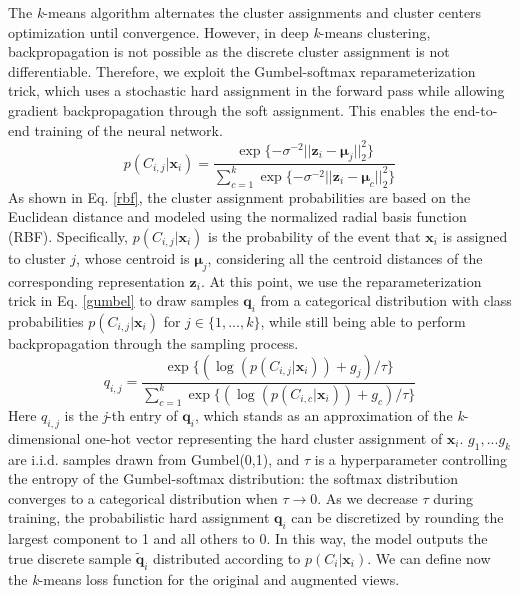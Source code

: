 \documentclass[times, review, 10pt]{elsarticle}
\begin{document}
The \textit{k}-means algorithm alternates the cluster assignments and cluster centers optimization until convergence. However, in deep \textit{k}-means clustering, backpropagation is not possible as the discrete cluster assignment is not differentiable. Therefore, we exploit the Gumbel-softmax reparameterization trick, which uses a stochastic hard assignment in the forward pass while allowing gradient backpropagation through the soft assignment. This enables the end-to-end training of the neural network.
%
\begin{equation}
    p(C_{i,j} | \mathbf{x}_i) = \frac{\exp{\{ -\sigma^{-2} \lvert\lvert \mathbf{z}_i - \bm{\mu}_j \rvert\rvert_2^2 \}}}{\sum_{c=1}^k \exp \{ -\sigma^{-2} \lvert\lvert \mathbf{z}_i - \bm{\mu}_c \rvert\rvert_2^2 \}}
    \label{rbf}
\end{equation}
%
As shown in Eq. \ref{rbf}, the cluster assignment probabilities are based on the Euclidean distance and modeled using the normalized radial basis function (RBF). Specifically, $p(C_{i,j} | \mathbf{x}_i)$ is the probability of the event that $\mathbf{x}_i$ is assigned to cluster $j$, whose centroid is $\bm{\mu}_j$, considering all the centroid distances of the corresponding representation $\mathbf{z}_i$. At this point, we use the reparameterization trick in Eq. \ref{gumbel} to draw samples $\mathbf{q}_i$ from a categorical distribution with class probabilities $p(C_{i,j} | \mathbf{x}_i)$ for $j \in \{1, ..., k\}$, while still being able to perform backpropagation through the sampling process.
%
\begin{equation}
    q_{i,j} = \frac{\exp{\{ (\log({p(C_{i,j} | \mathbf{x}_i)}) + g_j ) / \tau \}}}{\sum_{c=1}^k \exp{\{ (\log({p(C_{i,c} | \mathbf{x}_i)}) + g_c) / \tau \}} }
    \label{gumbel}
\end{equation}
%
Here $q_{i,j}$ is the \emph{j}-th entry of $\mathbf{q}_i$, which stands as an approximation of the \textit{k}-dimensional one-hot vector representing the hard cluster assignment of $\mathbf{x}_i$. $g_1, ... g_k$ are i.i.d. samples drawn from Gumbel(0,1), and $\tau$ is a hyperparameter controlling the entropy of the Gumbel-softmax distribution: the softmax distribution converges to a categorical distribution when $\tau \rightarrow 0$. As we decrease $\tau$ during training, the probabilistic hard assignment $\mathbf{q}_i$ can be discretized by rounding the largest component to 1 and all others to 0. In this way, the model outputs the true discrete sample $\mathbf{\tilde{q}}_i$ distributed according to $p(C_i | \mathbf{x}_i)$. We can define now the \textit{k}-means loss function for the original and augmented views.
\end{document}
